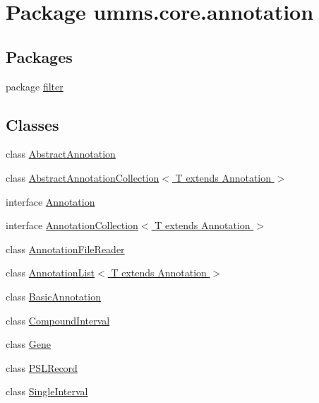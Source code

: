 \hypertarget{namespaceumms_1_1core_1_1annotation}{\section{Package umms.\+core.\+annotation}
\label{namespaceumms_1_1core_1_1annotation}
}
\subsection*{Packages}
\begin{DoxyCompactItemize}
\item 
package \hyperlink{namespaceumms_1_1core_1_1annotation_1_1filter}{filter}
\end{DoxyCompactItemize}
\subsection*{Classes}
\begin{DoxyCompactItemize}
\item 
class \hyperlink{classumms_1_1core_1_1annotation_1_1_abstract_annotation}{Abstract\+Annotation}
\item 
class \hyperlink{classumms_1_1core_1_1annotation_1_1_abstract_annotation_collection_3_01_t_01extends_01_annotation_01_4}{Abstract\+Annotation\+Collection$<$ T extends Annotation $>$}
\item 
interface \hyperlink{interfaceumms_1_1core_1_1annotation_1_1_annotation}{Annotation}
\item 
interface \hyperlink{interfaceumms_1_1core_1_1annotation_1_1_annotation_collection_3_01_t_01extends_01_annotation_01_4}{Annotation\+Collection$<$ T extends Annotation $>$}
\item 
class \hyperlink{classumms_1_1core_1_1annotation_1_1_annotation_file_reader}{Annotation\+File\+Reader}
\item 
class \hyperlink{classumms_1_1core_1_1annotation_1_1_annotation_list_3_01_t_01extends_01_annotation_01_4}{Annotation\+List$<$ T extends Annotation $>$}
\item 
class \hyperlink{classumms_1_1core_1_1annotation_1_1_basic_annotation}{Basic\+Annotation}
\item 
class \hyperlink{classumms_1_1core_1_1annotation_1_1_compound_interval}{Compound\+Interval}
\item 
class \hyperlink{classumms_1_1core_1_1annotation_1_1_gene}{Gene}
\item 
class \hyperlink{classumms_1_1core_1_1annotation_1_1_p_s_l_record}{P\+S\+L\+Record}
\item 
class \hyperlink{classumms_1_1core_1_1annotation_1_1_single_interval}{Single\+Interval}
\end{DoxyCompactItemize}
